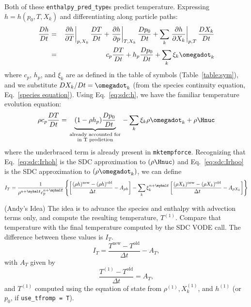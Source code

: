 \begin{itemize}
Both of these {\tt enthalpy\_pred\_type}s predict temperature.  Expressing
$h = h(p_0,T,X_k)$ and differentiating along particle paths:
\begin{eqnarray}
\frac{Dh}{Dt} &=& \left . \frac{\partial h}{\partial T} \right |_{p,X_k} \frac{DT}{Dt} +
                  \left . \frac{\partial h}{\partial p} \right |_{T,X_k} \frac{Dp_0}{Dt} +
           \sum_k \left . \frac{\partial h}{\partial X_k} \right |_{p,T} \frac{DX_k}{Dt} \\
              &=& c_p \frac{DT}{Dt} + h_p  \frac{Dp_0}{Dt} + \sum_k \xi_k \omegadot_k
\end{eqnarray}
where $c_p$, $h_p$, and $\xi_k$ are as defined in the table of symbols
(Table~\ref{table:sym}), and we substitute $DX_k/Dt = \omegadot_k$ (from the species
continuity equation, Eq.~\ref{species equation}).  Using Eq.~\ref{eq:sdc:h}, we have
the familiar temperature evolution equation:
\begin{equation}
\rho c_p \frac{DT}{Dt} = \underbrace{(1 - \rho h_p) \frac{Dp_0}{Dt}}_{\begin{smallmatrix}\text{already~accounted~for} \\ \text{in~T~prediction}\end{smallmatrix}} - \sum_k \xi_k \rho \omegadot_k + \rho \Hnuc
\end{equation}
where the underbraced term is already present in {\tt mktempforce}.  Recognizing that
Eq.~\ref{eq:sdc:Irhoh} is the SDC approximation to $(\rho \Hnuc)$ and Eq.~\ref{eq:sdc:Irhoo} is the 
SDC approximation to $(\rho \omegadot_k)$, we can define
\begin{equation}
I_T = \frac{1}{\rho^{n+\myhalf} c_p^{n+\myhalf}} \left \{
  \left [ \frac{(\rho h)^\mathrm{new} - (\rho h)^\mathrm{old}}{\Delta t} - A_{\rho h} \right ]
  - \sum_k \xi_k^{n+\myhalf} \left [      \frac{(\rho X_k)^\mathrm{new} - 
            (\rho X_k)^\mathrm{old}}{\Delta t} - A_{\rho X_k}  \right ] \right \}
\end{equation}

(Andy's Idea) The idea is to advance the species and enthalpy with advection
terms only, and compute the resulting temperature, $T^{(1)}$.  Compare that temperature
with the final temperature computed by the SDC VODE call.  The difference
between these values is $I_T$.
\begin{equation}
I_T = \frac{T^\mathrm{new} - T^\mathrm{old}}{\Delta t} - A_T,
\end{equation}
with $A_T$ given by
\begin{equation}
\frac{T^{(1)} - T^\mathrm{old}}{\Delta t} = A_T,
\end{equation}
and $T^{(1)}$ computed using the equation of state from $\rho^{(1)}, X_k^{(1)}$, 
and $h^{(1)}$ (or $p_0$, if {\tt use\_tfromp = T}).
\end{itemize}


